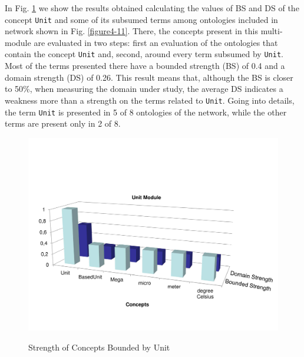 In Fig. \ref{figure4-16} we show the results obtained calculating the values of BS and DS  of the concept \texttt{Unit}   and some of its subsumed terms among ontologies included in network  shown in Fig. \ref{figure4-11}. There, the concepts present in this multi-module are evaluated in two steps: first an evaluation of the ontologies that contain the concept \texttt{Unit} and, second, around every term subsumed by \texttt{Unit}. Most of the terms presented there have a bounded strength (BS) of 0.4 and a domain strength (DS) of 0.26. This result means that, although the BS is closer to 50\%, when measuring the domain under study, the average DS indicates a weakness more than a strength on the terms related to \texttt{Unit}. Going into details, the term \texttt{Unit} is presented in 5 of 8 ontologies of the network, while the other terms are present only in 2 of 8. 






\begin{figure}
\begin{center}
	\includegraphics[scale=0.5]{figure-chapterIV/fig4-16.pdf}\\
	\caption{Strength of Concepts Bounded by Unit}
	\label{figure4-16}
\end{center}
\end{figure}

